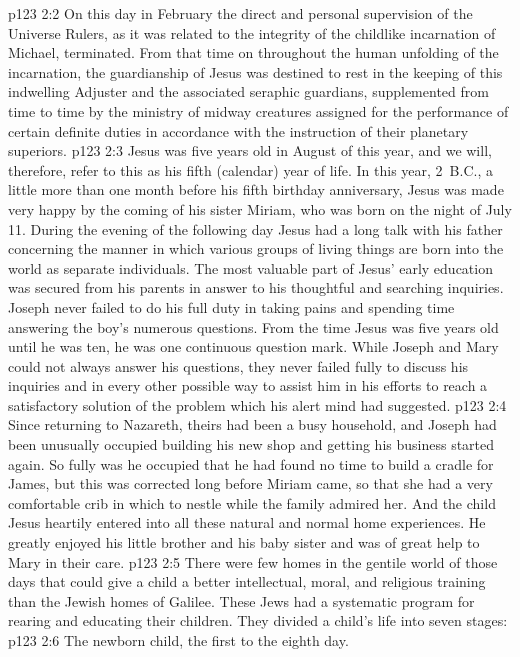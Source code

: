 \vs p123 2:2 On this day in February the direct and personal supervision of the Universe Rulers, as it was related to the integrity of the childlike incarnation of Michael, terminated. From that time on throughout the human unfolding of the incarnation, the guardianship of Jesus was destined to rest in the keeping of this indwelling Adjuster and the associated seraphic guardians, supplemented from time to time by the ministry of midway creatures assigned for the performance of certain definite duties in accordance with the instruction of their planetary superiors.
\pc \vs p123 2:3 Jesus was five years old in August of this year, and we will, therefore, refer to this as his fifth (calendar) year of life. In this year, 2~B.C., a little more than one month before his fifth birthday anniversary, Jesus was made very happy by the coming of his sister Miriam, who was born on the night of July 11. During the evening of the following day Jesus had a long talk with his father concerning the manner in which various groups of living things are born into the world as separate individuals. The most valuable part of Jesus’ early education was secured from his parents in answer to his thoughtful and searching inquiries. Joseph never failed to do his full duty in taking pains and spending time answering the boy’s numerous questions. From the time Jesus was five years old until he was ten, he was one continuous question mark. While Joseph and Mary could not always answer his questions, they never failed fully to discuss his inquiries and in every other possible way to assist him in his efforts to reach a satisfactory solution of the problem which his alert mind had suggested.
\vs p123 2:4 Since returning to Nazareth, theirs had been a busy household, and Joseph had been unusually occupied building his new shop and getting his business started again. So fully was he occupied that he had found no time to build a cradle for James, but this was corrected long before Miriam came, so that she had a very comfortable crib in which to nestle while the family admired her. And the child Jesus heartily entered into all these natural and normal home experiences. He greatly enjoyed his little brother and his baby sister and was of great help to Mary in their care.
\vs p123 2:5 There were few homes in the gentile world of those days that could give a child a better intellectual, moral, and religious training than the Jewish homes of Galilee. These Jews had a systematic program for rearing and educating their children. They divided a child’s life into seven stages:
\pc \vs p123 2:6 \bibnobreakspace The newborn child, the first to the eighth day.
